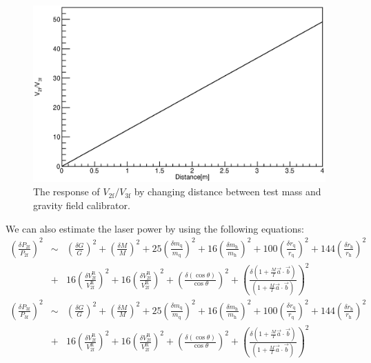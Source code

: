 \documentclass[A4]{spie}  %
\begin{document}
\begin{figure}
\begin{center}
\includegraphics[width=12cm]{dvsVV.eps}
\caption{The response of $V_{\mathrm{2f}}/V_{\mathrm{3f}}$ by changing distance between test mass and gravity field calibrator.}
\label{fig:dvsVV}
\end{center}
\end{figure}
We can also estimate the laser power by using the following equations:
\begin{eqnarray}
\left( \frac{\delta P_{\mathrm{2f}}}{P_{\mathrm{2f}}} \right)^2 &\sim& \left( \frac{\delta G}{G} \right)^2 + \left( \frac{\delta M}{M} \right)^2+25\left( \frac{\delta m_{\mathrm{q}}}{m_{\mathrm{q}}} \right)^2+16\left( \frac{\delta m_{\mathrm{h}}}{m_{\mathrm{h}}} \right)^2 +100\left( \frac{\delta r_{\mathrm{q}}}{r_{\mathrm{q}}} \right)^2+144\left( \frac{\delta r_{\mathrm{h}}}{r_{\mathrm{h}}} \right)^2 \nonumber \\
&+&16\left( \frac{\delta V^{\mathrm{R}}_{{\mathrm{2f}}}}{V^{\mathrm{R}}_{{\mathrm{2f}}}} \right)^2+16\left( \frac{\delta V^{\mathrm{R}}_{{\mathrm{2f}}}}{V^{\mathrm{R}}_{{\mathrm{2f}}}} \right)^2+\left( \frac{\delta (\cos{\theta})}{\cos{\theta}} \right)^2+ \left( \frac{\delta\left( 1+\frac{M}{I}\vec{a}\cdot \vec{b} \right)}{\left( 1+\frac{M}{I}\vec{a}\cdot \vec{b} \right)} \right)^2 \\
\left( \frac{\delta P_{\mathrm{3f}}}{P_{\mathrm{3f}}} \right)^2 &\sim& \left( \frac{\delta G}{G} \right)^2 + \left( \frac{\delta M}{M} \right)^2+25\left( \frac{\delta m_{\mathrm{q}}}{m_{\mathrm{q}}} \right)^2+16\left( \frac{\delta m_{\mathrm{h}}}{m_{\mathrm{h}}} \right)^2 +100\left( \frac{\delta r_{\mathrm{q}}}{r_{\mathrm{q}}} \right)^2+144\left( \frac{\delta r_{\mathrm{h}}}{r_{\mathrm{h}}} \right)^2 \nonumber \\
&+&16\left( \frac{\delta V^{\mathrm{R}}_{{\mathrm{2f}}}}{V^{\mathrm{R}}_{{\mathrm{2f}}}} \right)^2+16\left( \frac{\delta V^{\mathrm{R}}_{{\mathrm{2f}}}}{V^{\mathrm{R}}_{{\mathrm{2f}}}} \right)^2+\left( \frac{\delta (\cos{\theta})}{\cos{\theta}} \right)^2+ \left( \frac{\delta\left( 1+\frac{M}{I}\vec{a}\cdot \vec{b} \right)}{\left( 1+\frac{M}{I}\vec{a}\cdot \vec{b} \right)} \right)^2 
\end{eqnarray}
\end{document}
